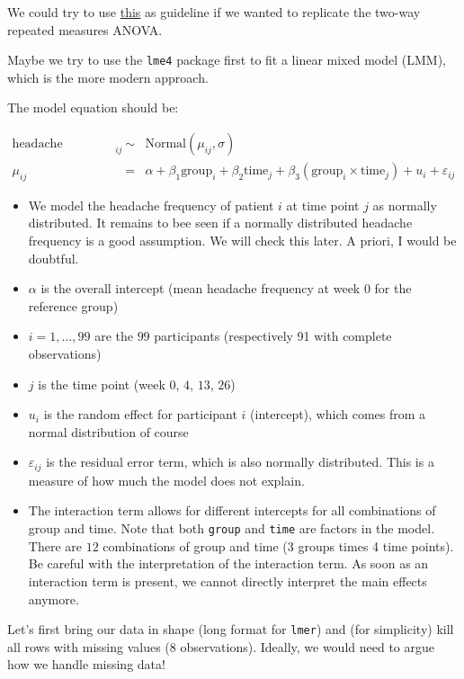 \documentclass[
]{book}
\providecommand{\tightlist}{%
  \setlength{\itemsep}{0pt}\setlength{\parskip}{0pt}}
\begin{document}
We could try to use \href{https://www.r-bloggers.com/2021/04/repeated-measures-of-anova-in-r-complete-tutorial/}{this}
as guideline if we wanted to replicate the two-way repeated measures ANOVA.

Maybe we try to use the \texttt{lme4} package first to fit a linear mixed model (LMM), which
is the more modern approach.

The model equation should be:

\[
\begin{array}{rcl}
\text{headache frequency}_{ij} &\sim& \text{Normal}(\mu_{ij}, \sigma) \\
\mu_{ij} &=& \alpha + \beta_1 \text{group}_i + \beta_2 \text{time}_j + \beta_3 (\text{group}_i \times \text{time}_j) + u_i + \varepsilon_{ij}
\end{array}
\]

\begin{itemize}
\tightlist
\item
  We model the headache frequency of patient \(i\) at time point \(j\) as normally distributed.
  It remains to bee seen if a normally distributed headache frequency is a good assumption.
  We will check this later. A priori, I would be doubtful.
\item
  \(\alpha\) is the overall intercept (mean headache frequency at week \(0\) for the reference group)
\item
  \(i = 1, \ldots, 99\) are the \(99\) participants (respectively 91 with complete observations)
\item
  \(j\) is the time point (week \(0\), \(4\), \(13\), \(26\))
\item
  \(u_i\) is the random effect for participant \(i\) (intercept), which comes from a normal distribution of course
\item
  \(\varepsilon_{ij}\) is the residual error term, which is also normally distributed.
  This is a measure of how much the model does not explain.
\item
  The interaction term allows for different intercepts for all combinations of group and time.
  Note that both \texttt{group} and \texttt{time} are factors in the model. There are \(12\) combinations of group and time
  (3 groups times 4 time points).
  Be careful with the interpretation of the interaction term. As soon as an interaction term
  is present, we cannot directly interpret the main effects anymore.
\end{itemize}

Let's first bring our data in shape (long format for \texttt{lmer}) and
(for simplicity) kill all rows with missing values (\(8\) observations).
Ideally, we would need to argue how we handle missing data!
\end{document}
